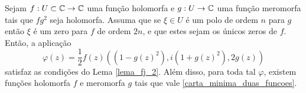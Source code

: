 \begin{teorema}
	Sejam $f: U \subset \mathbb{C} \rightarrow \mathbb{C}$ uma função holomorfa e $g: U \rightarrow \mathbb{C}$ uma função meromorfa tais que $fg^2$ seja holomorfa. Assuma que se $\xi \in U$ é um polo de ordem $n$ para $g$ então $\xi$ é um zero para $f$ de ordem $2n$, e que estes sejam os únicos zeros de $f$.
	Então, a aplicação
	\begin{equation}\label{carta_minima_duas_funcoes}
	\varphi(z) = \frac{1}{2} f(z) \left( (1-g(z)^2), i (1+g(z)^2), 2g(z) \right)
	\end{equation}
	satisfaz as condições do Lema \ref{lema_fj_2}. Além disso, para toda tal $\varphi$, existem funções holomorfa $f$ e meromorfa $g$ tais que vale \eqref{carta_minima_duas_funcoes}.
\end{teorema}

